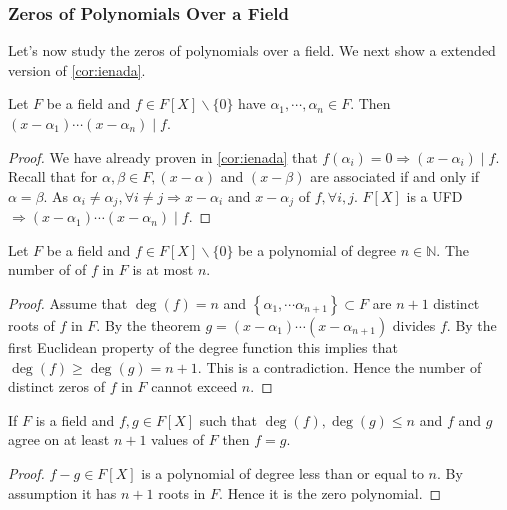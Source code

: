 \documentclass{article}
\begin{document}
\subsubsection{Zeros of Polynomials Over a Field}
Let's now study the zeros of polynomials over a field. We next show a extended version of \cref{cor:ienada}.
\begin{thma}
Let $F$ be a field and $f \in F[X] \backslash\{0\}$ have  $\alpha_{1}, \cdots, \alpha_{n} \in F$. Then $\left(x-\alpha_{1}\right) \cdots\left(x-\alpha_{n}\right) \mid f$.
\end{thma}
\begin{proof}
We have already proven  in \cref{cor:ienada} that $f\left(\alpha_{i}\right)=0 \Rightarrow\left(x-\alpha_{i}\right) \mid f$. Recall that for $\alpha, \beta \in F,(x-\alpha)$ and $(x-\beta)$ are associated if and only if $\alpha=\beta$. As $\alpha_{i} \neq \alpha_{j}, \forall i \neq j \Rightarrow x-\alpha_{i}$ and $x-\alpha_{j}$  of $f, \forall i, j$. $F[X]$ is a UFD $\Rightarrow\left(x-\alpha_{1}\right) \cdots\left(x-\alpha_{n}\right) \mid f$.
\end{proof} 
\begin{cora}
Let $F$ be a field and $f \in F[X]\backslash\{0\}$ be a polynomial of degree $n \in \mathbb{N}$. The number of  of $f$ in $F$ is at most $n$.
\end{cora} 
\begin{proof}
Assume that $\operatorname{deg}(f)=n$ and $\left\{\alpha_{1}, \cdots \alpha_{n+1}\right\} \subset F$ are $n+1$ distinct roots of $f$ in $F$. By the theorem $g=\left(x-\alpha_{1}\right) \cdots\left(x-\alpha_{n+1}\right)$ divides $f$. By the first Euclidean property of the degree function this implies that $\operatorname{deg}(f) \geq \operatorname{deg}(g)=n+1$. This is a contradiction. Hence the number of distinct zeros of $f$ in $F$ cannot exceed $n$.
\end{proof} 

\begin{cora}
If $F$ is a field and $f, g \in F[X]$ such that $\operatorname{deg}(f), \operatorname{deg}(g) \leq n$ and $f$ and $g$ agree on at least $n+1$ values of $F$ then $f=g$.
\end{cora} 
\begin{proof}
$f-g \in F[X]$ is a polynomial of degree less than or equal to $n$. By assumption it has $n+1$ roots in $F$. Hence it is the zero polynomial.
\end{proof} 
\end{document}
